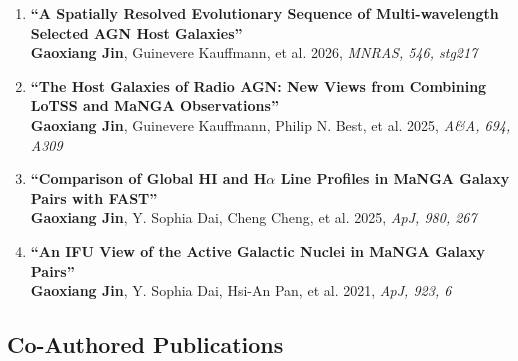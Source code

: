 \documentclass[12pt,a4paper]{article}
\begin{document}
\begin{enumerate}[leftmargin=*, itemsep=6pt]
  \item \textbf{``A Spatially Resolved Evolutionary Sequence of Multi-wavelength Selected AGN Host Galaxies''} \\
  \textbf{Gaoxiang Jin}, Guinevere Kauffmann, et al. 2026, \textit{MNRAS, 546, stg217}

  \item \textbf{``The Host Galaxies of Radio AGN: New Views from Combining LoTSS and MaNGA Observations''} \\
  \textbf{Gaoxiang Jin}, Guinevere Kauffmann, Philip N. Best, et al. 2025, \textit{A\&A, 694, A309}
  
  \item \textbf{``Comparison of Global HI and H$\alpha$ Line Profiles in MaNGA Galaxy Pairs with FAST''} \\
  \textbf{Gaoxiang Jin}, Y. Sophia Dai, Cheng Cheng, et al. 2025, \textit{ApJ, 980, 267}

  \item \textbf{``An IFU View of the Active Galactic Nuclei in MaNGA Galaxy Pairs''} \\
  \textbf{Gaoxiang Jin}, Y. Sophia Dai, Hsi-An Pan, et al. 2021, \textit{ApJ, 923, 6}

\end{enumerate}

\subsection*{Co-Authored Publications}
\end{document}
